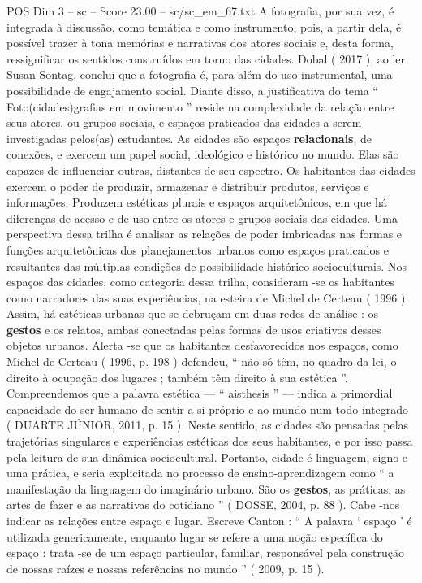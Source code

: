 \begin{textsample}{POS Dim 3 – sc – Score 23.00 – sc/sc\_em\_67.txt}
A fotografia, por sua vez, é integrada à discussão, como temática e como instrumento, pois, a partir dela, é possível trazer à tona memórias e narrativas dos atores sociais e, desta forma, ressignificar os sentidos construídos em torno das cidades.
Dobal ( 2017 ), ao ler Susan Sontag, conclui que a fotografia é, para além do uso instrumental, uma possibilidade de engajamento social.
Diante disso, a justificativa do tema “ Foto(cidades)grafias em movimento ” reside na complexidade da relação entre seus atores, ou grupos sociais, e espaços praticados das cidades a serem investigadas pelos(as) estudantes.
As cidades são espaços \textbf{relacionais}, de conexões, e exercem um papel social, ideológico e histórico no mundo.
Elas são capazes de influenciar outras, distantes de seu espectro.
Os habitantes das cidades exercem o poder de produzir, armazenar e distribuir produtos, serviços e informações.
Produzem estéticas plurais e espaços arquitetônicos, em que há diferenças de acesso e de uso entre os atores e grupos sociais das cidades.
Uma perspectiva dessa trilha é analisar as relações de poder imbricadas nas formas e funções arquitetônicas dos planejamentos urbanos como espaços praticados e resultantes das múltiplas condições de possibilidade histórico-socioculturais.
Nos espaços das cidades, como categoria dessa trilha, consideram -se os habitantes como narradores das suas experiências, na esteira de Michel de Certeau ( 1996 ).
Assim, há estéticas urbanas que se debruçam em duas redes de análise : os \textbf{gestos} e os relatos, ambas conectadas pelas formas de usos criativos desses objetos urbanos.
Alerta -se que os habitantes desfavorecidos nos espaços, como Michel de Certeau ( 1996, p. 198 ) defendeu, “ não só têm, no quadro da lei, o direito à ocupação dos lugares ; também têm direito à sua estética ”.
Compreendemos que a palavra estética — “ aisthesis ” — indica a primordial capacidade do ser humano de sentir a si próprio e ao mundo num todo integrado ( DUARTE JÚNIOR, 2011, p. 15 ).
Neste sentido, as cidades são pensadas pelas trajetórias singulares e experiências estéticas dos seus habitantes, e por isso passa pela leitura de sua dinâmica sociocultural.
Portanto, cidade é linguagem, signo e uma prática, e seria explicitada no processo de ensino-aprendizagem como “ a manifestação da linguagem do imaginário urbano.
São os \textbf{gestos}, as práticas, as artes de fazer e as narrativas do cotidiano ” ( DOSSE, 2004, p. 88 ).
Cabe -nos indicar as relações entre espaço e lugar.
Escreve Canton : “ A palavra ‘ espaço ’ é utilizada genericamente, enquanto lugar se refere a uma noção específica do espaço : trata -se de um espaço particular, familiar, responsável pela construção de nossas raízes e nossas referências no mundo ” ( 2009, p. 15 ).

\end{textsample}
